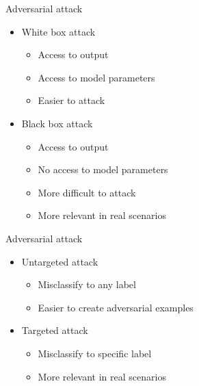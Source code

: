 \documentclass[11pt,t]{beamer}
\begin{document}
\begin{frame}{Adversarial attack}
\begin{itemize}
	\item White box attack
	\begin{itemize}
		\item Access to output
		\item Access to model parameters
		\item Easier to attack
	\end{itemize}
	\item Black box attack
	\begin{itemize}
		\item Access to output
		\item \alert{No} access to model parameters
		\item More difficult to attack
		\item More relevant in real scenarios
	\end{itemize}
\end{itemize}
\end{frame}

\begin{frame}{Adversarial attack}
\begin{itemize}
	\item Untargeted attack
	\begin{itemize}
		\item Misclassify to \alert{any} label
		\item Easier to create adversarial examples
	\end{itemize}
	\item Targeted attack
	\begin{itemize}
		\item Misclassify to \alert{specific} label
		\item More relevant in real scenarios
	\end{itemize}
\end{itemize}
\end{frame}
\end{document}
